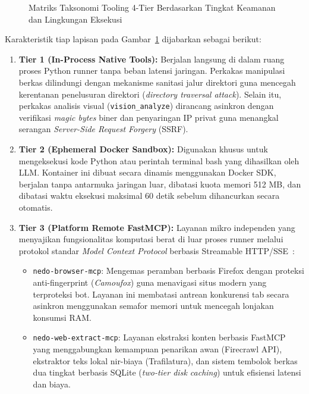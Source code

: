 \begin{figure}[H]
{
  }
  \caption{Matriks Taksonomi Tooling 4-Tier Berdasarkan Tingkat Keamanan dan Lingkungan Eksekusi}
  \label{fig:tooling_taxonomy}
\end{figure}

Karakteristik tiap lapisan pada Gambar~\ref{fig:tooling_taxonomy} dijabarkan sebagai berikut:
\begin{enumerate}[label=\alph*.]
  \item \textbf{Tier 1 (In-Process Native Tools):} Berjalan langsung di dalam ruang proses Python runner tanpa beban latensi jaringan. Perkakas manipulasi berkas dilindungi dengan mekanisme sanitasi jalur direktori guna mencegah kerentanan penelusuran direktori (\textit{directory traversal attack}). Selain itu, perkakas analisis visual (\texttt{vision\_analyze}) dirancang asinkron dengan verifikasi \textit{magic bytes} biner dan penyaringan IP privat guna menangkal serangan \textit{Server-Side Request Forgery} (SSRF).
  \item \textbf{Tier 2 (Ephemeral Docker Sandbox):} Digunakan khusus untuk mengeksekusi kode Python atau perintah terminal bash yang dihasilkan oleh LLM. Kontainer ini dibuat secara dinamis menggunakan Docker SDK, berjalan tanpa antarmuka jaringan luar, dibatasi kuota memori 512 MB, dan dibatasi waktu eksekusi maksimal 60 detik sebelum dihancurkan secara otomatis.
  \item \textbf{Tier 3 (Platform Remote FastMCP):} Layanan mikro independen yang menyajikan fungsionalitas komputasi berat di luar proses runner melalui protokol standar \textit{Model Context Protocol} berbasis Streamable HTTP/SSE~\cite{mcp_spec}:
    \begin{itemize}
      \item \texttt{nedo-browser-mcp}: Mengemas peramban berbasis Firefox dengan proteksi anti-fingerprint (\textit{Camoufox}) guna menavigasi situs modern yang terproteksi bot. Layanan ini membatasi antrean konkurensi tab secara asinkron menggunakan semafor memori untuk mencegah lonjakan konsumsi RAM.
      \item \texttt{nedo-web-extract-mcp}: Layanan ekstraksi konten berbasis FastMCP yang menggabungkan kemampuan penarikan awan (Firecrawl API), ekstraktor teks lokal nir-biaya (Trafilatura), dan sistem tembolok berkas dua tingkat berbasis SQLite (\textit{two-tier disk caching}) untuk efisiensi latensi dan biaya.

\end{itemize}
\end{enumerate}
